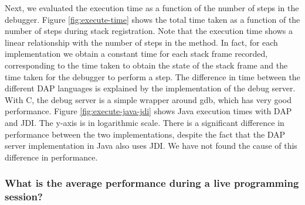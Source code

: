 \documentclass[english,submission]{programming}
\begin{document}
Next, we evaluated the execution time as a function of the number of steps in the debugger. 
Figure \ref{fig:execute-time} shows the total time taken as a function of the number of steps during stack registration.
Note that the execution time shows a linear relationship with the number of steps in the method. 
In fact, for each implementation we obtain a constant time for each stack frame recorded, corresponding to the time taken to obtain the state of the stack frame and the time taken for the debugger to perform a step. 
The difference in time between the different DAP languages is explained by the implementation of the debug server. 
With C, the debug server is a simple wrapper around gdb, which has very good performance.
Figure \ref{fig:execute-java-jdi} shows Java execution times with DAP and JDI. 
The y-axis is in logarithmic scale. 
There is a significant difference in performance between the two implementations, despite the fact that the DAP server implementation in Java also uses JDI.
We have not found the cause of this difference in performance. %

\subsubsection{What is the average performance during a live programming session?}
\end{document}
